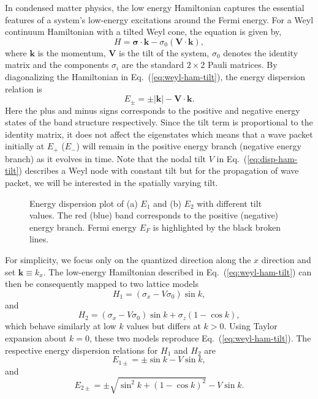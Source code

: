 \documentclass[%
 aip,
 amsmath,amssymb,
 reprint,%
]{revtex4-1}
\begin{document}
In condensed matter physics, the low energy Hamiltonian captures the essential features of a system's low-energy excitations around the Fermi energy. For a Weyl continuum Hamiltonian with a tilted Weyl cone, the equation is given by,
\begin{equation}
  \label{eq:weyl-ham-tilt}
  H=\mathbf{\sigma} \cdot \mathbf{k} - \sigma_0 (\mathbf{V} \cdot \mathbf{k}),
\end{equation}
where $\mathbf{k}$ is the momentum, $\mathbf{V}$ is the tilt of the system, $\sigma_0$ denotes the identity matrix and the components $\sigma_i$ are the standard $2 \times 2$ Pauli matrices. By diagonalizing the Hamiltonian in Eq.\ (\ref{eq:weyl-ham-tilt}), the energy dispersion relation is
\begin{equation}
  \label{eq:disp-ham-tilt}
  E_{\pm} = \pm |\mathbf{k}| - \mathbf{V} \cdot \mathbf{k}.
\end{equation}
Here the plus and minus signs corresponds to the positive and negative energy states of the band structure respectively. Since the tilt term is proportional to the identity matrix, it does not affect the eigenstates which means that a wave packet initially at $E_+$ ($E_-$) will remain in the positive energy branch (negative energy branch) as it evolves in time. Note that the nodal tilt $V$ in Eq.\ (\ref{eq:disp-ham-tilt}) describes a Weyl node with constant tilt but for the propagation of wave packet, we will be interested in the spatially varying tilt.

\begin{figure}[bt]
  \vspace*{8pt}
  \caption{Energy dispersion plot of (a) $E_1$ and (b) $E_2$ with different tilt values. The red (blue) band corresponds to the positive (negative) energy branch. Fermi energy $E_F$ is highlighted by the black broken lines.}\label{fig:energy-disp}
\end{figure}

For simplicity, we focus only on the quantized direction along the $x$ direction and set $\textbf{k} \equiv k_x$. The low-energy Hamiltonian described in Eq.\ (\ref{eq:weyl-ham-tilt}) can then be consequently mapped to two lattice models
\begin{equation}
H_1 = (\sigma_x - V \sigma_0) \sin k,
\end{equation}
and
\begin{equation}
H_2 = (\sigma_x - V \sigma_0) \sin k + \sigma_z (1 - \cos k),
\end{equation}
which behave similarly at low $k$ values but differs at $k>0$. Using Taylor expansion about $k=0$, these two models reproduce Eq.\ (\ref{eq:weyl-ham-tilt}). The respective energy dispersion relations for $H_1$ and $H_2$ are
\begin{equation}
  \label{eq:energy-disp}
E_{1\pm} = \pm \sin k - V \sin k,
\end{equation}
and
\begin{equation}
\label{eq:energy-disp2}
E_{2\pm} = \pm \sqrt{\sin^2 k + (1 - \cos k)^2} - V \sin k.
\end{equation}
\end{document}

